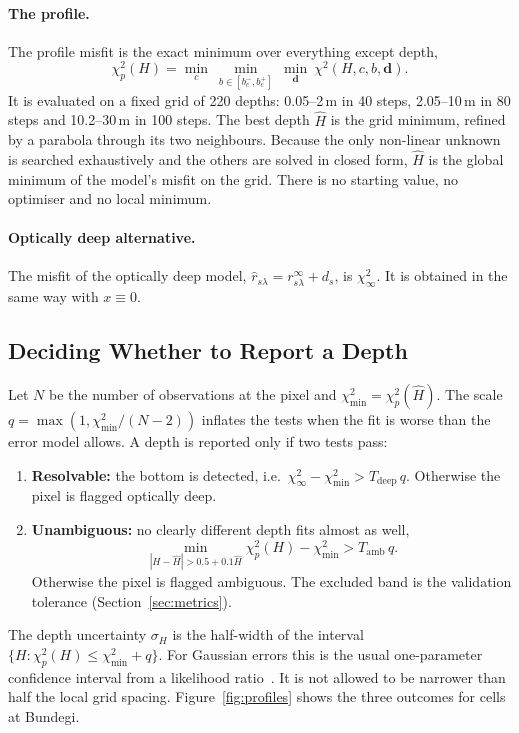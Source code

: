 \documentclass[remotesensing,article,submit,pdftex]{Definitions/mdpi}
\begin{document}
\paragraph{The profile.} The profile misfit is the exact minimum over everything except depth,
\begin{equation}
\chi^2_p(H) = \min_{c}\ \min_{b \in [b_c^-, b_c^+]}\ \min_{\mathbf{d}}\ \chi^2(H, c, b, \mathbf{d}).
\end{equation}
It is evaluated on a fixed grid of 220 depths: 0.05--2\,m in 40 steps, 2.05--10\,m in 80 steps and 10.2--30\,m in 100 steps. The best depth $\hat H$ is the grid minimum, refined by a parabola through its two neighbours. Because the only non-linear unknown is searched exhaustively and the others are solved in closed form, $\hat H$ is the global minimum of the model's misfit on the grid. There is no starting value, no optimiser and no local minimum.

\paragraph{Optically deep alternative.} The misfit of the optically deep model, $\hat r_{s\lambda} = r^\infty_{s\lambda} + d_s$, is $\chi^2_\infty$. It is obtained in the same way with $x \equiv 0$.

\subsection{Deciding Whether to Report a Depth}\label{sec:decide}

Let $N$ be the number of observations at the pixel and $\chi^2_\mathrm{min} = \chi^2_p(\hat H)$. The scale $q = \max\left(1, \chi^2_\mathrm{min}/(N - 2)\right)$ inflates the tests when the fit is worse than the error model allows. A depth is reported only if two tests pass:
\begin{enumerate}
\item \textbf{Resolvable:} the bottom is detected, i.e.\ $\chi^2_\infty - \chi^2_\mathrm{min} > T_\mathrm{deep}\,q$. Otherwise the pixel is flagged optically deep.
\item \textbf{Unambiguous:} no clearly different depth fits almost as well,
\begin{equation}
\min_{|H - \hat H| > 0.5 + 0.1\hat H} \chi^2_p(H) - \chi^2_\mathrm{min} > T_\mathrm{amb}\,q .
\end{equation}
Otherwise the pixel is flagged ambiguous. The excluded band is the validation tolerance (Section~\ref{sec:metrics}).
\end{enumerate}
The depth uncertainty $\sigma_H$ is the half-width of the interval $\{H : \chi^2_p(H) \le \chi^2_\mathrm{min} + q\}$. For Gaussian errors this is the usual one-parameter confidence interval from a likelihood ratio~\cite{wilks1938}. It is not allowed to be narrower than half the local grid spacing. Figure~\ref{fig:profiles} shows the three outcomes for cells at Bundegi.
\end{document}

